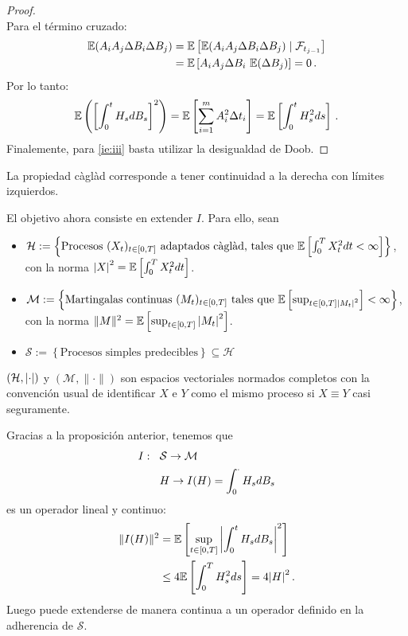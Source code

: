 \begin{proof}
\\ Para el término cruzado:
\begin{align*}
    \mathbb{E} (A_i A_j \Delta B_i \Delta B_j) 
    &= \mathbb{E} \left[ \mathbb{E} (A_i A_j \Delta B_i \Delta B_j) \mid \mathcal{F}_{t_{j-1}}\right] \\
    &= \mathbb{E} \left[ A_i A_j \Delta B_i ~ \mathbb{E} (\Delta B_j) \right] = 0\,.
\end{align*}
Por lo tanto:
\begin{equation*}
        \mathbb{E} \left( \left[ \int_{0}^{t} H_s dB_s \right]^2  \right) =
        \mathbb{E} \left[ \sum_{i=1}^{m} A_i^2 \Delta t_i \right] = \mathbb{E} \left[\int_{0}^{t} H_s^2 ds \right]\,.
\end{equation*}
Finalemente, para \ref{ie:iii} basta utilizar la desigualdad de Doob.\findem
\negro
\end{proof}
\begin{notation}
    La propiedad càglàd corresponde a tener continuidad a la derecha con límites izquierdos.
\end{notation}
\newp El objetivo ahora consiste en extender $I$. Para ello, sean 
\begin{itemize}
    \item $\mathcal{H} := \left\{ \text{Procesos } (X_t)_{t \in [0,T]} \text{ adaptados càglàd, tales que } \mathbb{E} \left[ \int_{0}^{T} X^2_t dt < \infty \right] \right\}$, 
    \\ con la norma $\abs{X}^2 = \mathbb{E} \left[ \int_{0}^{T} X^2_t dt \right]$.
    \item $\mathcal{M}  := \left\{ \text{Martingalas continuas } (M_t)_{t \in [0,T]} \text{ tales que } \mathbb{E}\left[ \sup_{t \in [0,T] \abs{M_t}^2} \right] < \infty \right\}$, 
    \\ con la norma $ \|M\|^2 = \mathbb{E} \left[\sup_{t \in [0,T]} \abs{M_t}^2 \right]$.
    \item $\mathcal{S} := \left\{\text{Procesos simples predecibles} \right\} \subseteq \mathcal{H}$
\end{itemize}

\begin{remark}
    $(\mathcal{H},\abs{\cdot})$ y $(\mathcal{M}, \|\cdot\|)$ son espacios vectoriales normados completos con la convención usual de identificar $X$ e $Y$ como el mismo proceso si $X \equiv Y$ casi seguramente.
\end{remark}

Gracias a la proposición anterior, tenemos que 
\begin{align*}
        I: \hspace{.25cm}\, & \mathcal{S} \to \mathcal{M} \\ 
           & H \to I(H) = \int_{0}^{\cdot} H_s dB_s 
\end{align*}
es un operador lineal y continuo: 
\begin{align*}
        \| I (H) \|^{2} &= \mathbb{E} \left[ \sup_{t \in [0,T]} \abs{\int_{0}^t H_s dB_s}^2 \right]\\
        &\le 4 \mathbb{E} \left[ \int_{0}^{T} H_s^2 ds \right] = 4 \abs{H}^2\,.
\end{align*}
Luego puede extenderse de manera continua a un operador definido en la adherencia de $\mathcal{S}$. 

